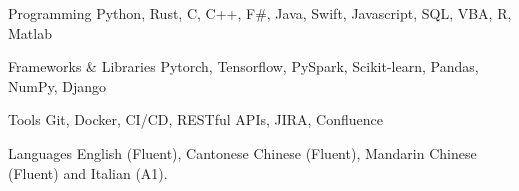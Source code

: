 

\begin{cvskills}

  \cvskill
    {Programming} %
    {Python, Rust, C, C++, F\#, Java, Swift, Javascript, SQL, VBA, R, Matlab} %

  \cvskill
    {Frameworks \& Libraries} %
    {Pytorch, Tensorflow, PySpark, Scikit-learn, Pandas, NumPy, Django} %

  \cvskill
    {Tools} %
    {Git, Docker, CI/CD, RESTful APIs, JIRA, Confluence} %

  \cvskill
    {Languages} %
    {English (Fluent), Cantonese Chinese (Fluent), Mandarin Chinese (Fluent) and Italian (A1).} %


\end{cvskills}
